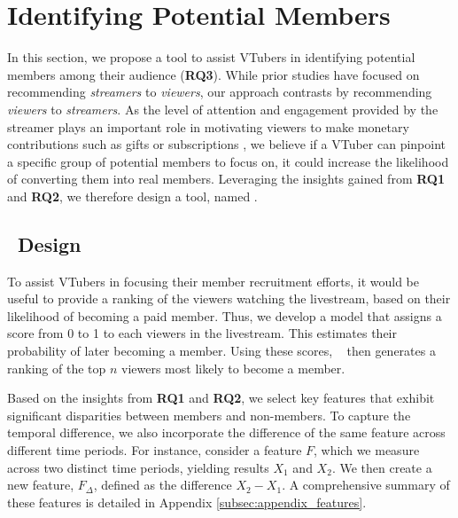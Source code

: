 \section{Identifying Potential Members}
\label{sec:RQ3}



In this section, we propose a tool to assist VTubers in identifying potential members among their audience (\textbf{RQ3}).
While prior studies have focused on recommending \emph{streamers} to \emph{viewers}, our approach contrasts by recommending \emph{viewers} to \emph{streamers}. 
As the level of attention and engagement provided by the streamer plays an important role in motivating viewers to make monetary contributions such as gifts or subscriptions \cite{10.1145/3338286.3340144, lu2018watch}, we believe if a VTuber can pinpoint a specific group of potential members to focus on, it could increase the likelihood of converting them into real members. 
Leveraging the insights gained from \textbf{RQ1} and \textbf{RQ2}, we therefore design a tool, named \toolname.




\subsection{\toolname~Design}

To assist VTubers in focusing their member recruitment efforts, it would be useful to provide a ranking of the viewers watching the livestream, based on their likelihood of becoming a paid member.
Thus, we develop a model that assigns a score from 0 to 1 to each viewers in the livestream.
This estimates their probability of later becoming a member. 
Using these scores, \toolname~ then generates a ranking of the top $n$ viewers most likely to become a member. 


Based on the insights from \textbf{RQ1} and \textbf{RQ2}, we select key features that exhibit significant disparities between members and non-members. To capture the temporal difference, we also incorporate the difference of the same feature across different time periods. 
For instance, consider a feature $F$, which we measure across two distinct time periods, yielding results $X_1$ and $X_2$. We then create a new feature, $F_{\Delta}$, defined as the difference $X_2 - X_1$.
A comprehensive summary of these features is detailed in Appendix \ref{subsec:appendix_features}.


